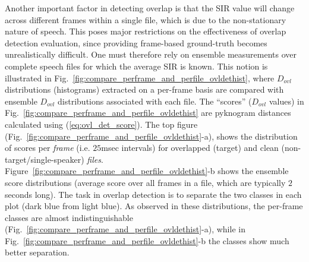 {Another important factor in detecting overlap is that the SIR value will change across different frames within a single file, which is due to the non-stationary nature of speech. 
This poses major restrictions on the effectiveness of overlap detection evaluation, since providing frame-based ground-truth becomes unrealistically difficult. 
One must therefore rely on ensemble measurements over complete speech files for which the average SIR is known. 
This notion is illustrated in Fig.~\ref{fig:compare_perframe_and_perfile_ovldethist}, where $D_{ovl}$ distributions (histograms) extracted on a per-frame basis are compared with ensemble $D_{ovl}$ distributions associated with each file. 
The ``scores'' ($D_{ovl}$ values) in Fig.~\ref{fig:compare_perframe_and_perfile_ovldethist} are pyknogram distances calculated using (\ref{eq:ovl_det_score}). 
The top figure (Fig.~\ref{fig:compare_perframe_and_perfile_ovldethist}-a), shows the distribution of scores per {\it frame} (i.e. $25$msec intervals) for overlapped (target) and clean (non-target/single-speaker) {\it files}.  
Figure~\ref{fig:compare_perframe_and_perfile_ovldethist}-b shows the ensemble score distributions (average score over all frames in a file, which are typically $2$ seconds long). 
The task in overlap detection is to separate the two classes in each plot (dark blue from light blue). 
As observed in these distributions, the per-frame classes are almost indistinguishable (Fig.~\ref{fig:compare_perframe_and_perfile_ovldethist}-a), while in Fig.~\ref{fig:compare_perframe_and_perfile_ovldethist}-b the classes show much better separation. 


}
